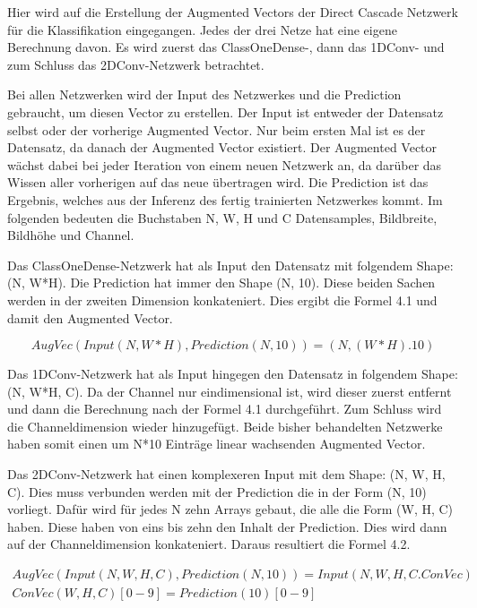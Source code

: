 Hier wird auf die Erstellung der Augmented Vectors der Direct Cascade Netzwerk für die Klassifikation eingegangen. Jedes der drei Netze hat 
eine eigene Berechnung davon. Es wird zuerst das ClassOneDense-, dann das 1DConv- und zum Schluss das 2DConv-Netzwerk betrachtet. 

Bei allen Netzwerken wird der Input des Netzwerkes und die Prediction gebraucht, um diesen Vector zu erstellen. Der Input ist entweder der 
Datensatz selbst oder der vorherige Augmented Vector. Nur beim ersten Mal ist es der Datensatz, da danach der Augmented Vector existiert. 
Der Augmented Vector wächst dabei bei jeder Iteration von einem neuen Netzwerk an, da darüber das Wissen aller vorherigen auf das neue 
übertragen wird. 
Die Prediction ist das Ergebnis, welches aus der Inferenz des fertig trainierten Netzwerkes kommt. Im folgenden bedeuten die Buchstaben N, W, 
H und C Datensamples, Bildbreite, Bildhöhe und Channel. 

Das ClassOneDense-Netzwerk hat als Input den Datensatz mit folgendem Shape: (N, W*H). 
Die Prediction hat immer den Shape (N, 10). 
Diese beiden Sachen werden in der zweiten Dimension konkateniert. Dies ergibt die Formel 4.1 und damit den Augmented Vector. 

\begin{equation}
    AugVec(Input(N, W*H), Prediction(N, 10)) = (N, (W*H).10)
\end{equation}

Das 1DConv-Netzwerk hat als Input hingegen den Datensatz in folgendem Shape: (N, W*H, C). Da der Channel nur eindimensional ist, wird dieser 
zuerst entfernt und dann die Berechnung nach der Formel 4.1 durchgeführt. Zum Schluss wird die Channeldimension wieder hinzugefügt. 
Beide bisher behandelten Netzwerke haben somit einen um N*10 Einträge linear wachsenden Augmented Vector. 

Das 2DConv-Netzwerk hat einen komplexeren Input mit dem Shape: (N, W, H, C). Dies muss verbunden werden mit der Prediction die in der Form (N, 10) 
vorliegt. Dafür wird für jedes N zehn Arrays gebaut, die alle die Form (W, H, C) haben. Diese haben von eins bis zehn den Inhalt der Prediction. 
Dies wird dann auf der Channeldimension konkateniert. Daraus resultiert die Formel 4.2. 

\begin{multline}
    AugVec(Input(N, W, H, C), Prediction(N, 10)) = Input(N, W, H, C.ConVec)\\
    ConVec(W, H, C)[0-9] = Prediction(10)[0-9]
\end{multline}

